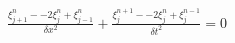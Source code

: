 \documentclass[preview]{standalone}
\begin{document}
\begin{align*}
\frac{\xi_{j+1}^{n} - -2 \xi_{j}^{n} + \xi_{j-1}^{n}}{\delta x^2} + \frac{\xi_{j}^{n+1} - -2 \xi_{j}^{n} + \xi_{j}^{n-1}}{\delta t^2}  = 0
\end{align*}
\end{document}
